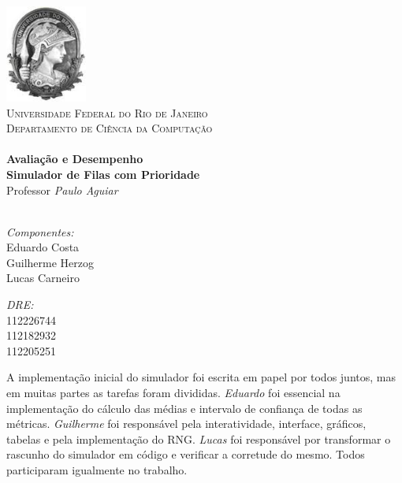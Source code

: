 \begin{titlepage}

\begin{center}

\includegraphics[width=0.20\textwidth]{./logo.jpeg}\\[0.8cm]

\textsc{\LARGE Universidade Federal do Rio de Janeiro}\\
\textsc{Departamento de Ciência da Computação}\\[0.0cm]


\HRule \\[0.4cm]
{ \huge \bfseries Avaliação e Desempenho }\\[0.4cm]
{ \large \bfseries Simulador de Filas com Prioridade } \\[0.4cm]
\small Professor \emph{Paulo Aguiar}\\
\HRule \\[0.6cm]


\begin{minipage}{0.6\textwidth}
  \begin{flushleft} 
  \emph{Componentes:}\\
  Eduardo Costa \\
  Guilherme Herzog \\
  Lucas Carneiro
  \end{flushleft}
\end{minipage}
\begin{minipage}{0.3\textwidth}
  \begin{flushright}
  \emph{DRE:} \\
  112226744 \\
  112182932 \\
  112205251
  \end{flushright}
\end{minipage}

\vfill

\vspace{25pt}

\begin{minipage}{1.0\textwidth}
  \small A implementação inicial do simulador foi escrita em papel por todos juntos, mas em muitas partes as tarefas foram divididas. \emph{Eduardo} foi essencial na implementação do cálculo das médias e intervalo de confiança de todas as métricas. \emph{Guilherme} foi responsável pela interatividade, interface, gráficos, tabelas e pela implementação do RNG. \emph{Lucas} foi responsável por transformar o rascunho do simulador em código e verificar a corretude do mesmo. Todos participaram igualmente no trabalho.
  

\end{minipage}
\end{center}
\end{titlepage}
